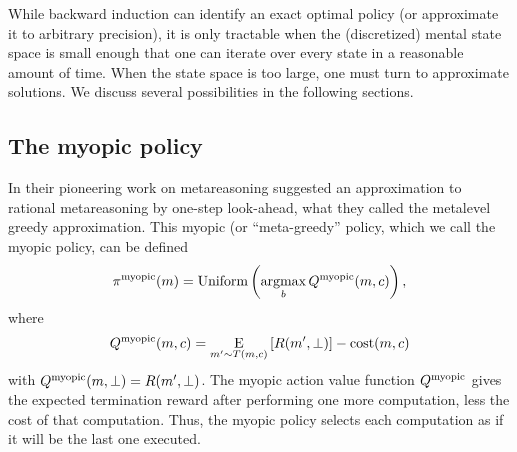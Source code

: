 


\separator

While backward induction can identify an exact optimal policy (or approximate it to arbitrary precision), it is only tractable when the (discretized) mental state space is small enough that one can iterate over every state in a reasonable amount of time. When the state space is too large, one must turn to approximate solutions. We discuss several possibilities in the following sections.

\subsection{The myopic policy}

In their pioneering work on metareasoning \citet{russell1991principles} suggested an approximation to rational metareasoning by one-step look-ahead, what they called the metalevel greedy approximation. This myopic (or ``meta-greedy'' policy, which we call the myopic policy, can be defined
\begin{equation}
  \pi^{\mathrm{myopic}}(m) = \mathrm{Uniform}\left(\operatorname*{argmax}_b Q^{\mathrm{myopic}}(m, c)\right),
\end{equation}
where
\begin{equation}\label{eq:Q-myopic}
Q^{\mathrm{myopic}}(m, c) = \operatorname*{E}_{m' \sim T(m, c)}\left[ 
  R(m', \bot)
\right] - \text{cost}(m, c)
\end{equation}
with $Q^{\mathrm{myopic}}(m, \bot) = R(m', \bot)$. The myopic action value function $Q^{\mathrm{myopic}}$ gives the expected termination reward after performing one more computation, less the cost of that computation. Thus, the myopic policy selects each computation as if it will be the last one executed.

